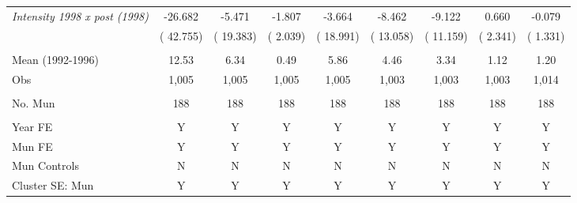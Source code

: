 \begin{tabular}{lcccccccc}
\textit{Intensity 1998 x post (1998)} &      -26.682  &       -5.471 &       -1.807 &       -3.664 &       -8.462  &       -9.122 &        0.660 &       -0.079\\  
& (      42.755)  & (      19.383) & (       2.039) & (      18.991) & (      13.058)  & (      11.159) & (       2.341) & (       1.331) \\ 
 &  & &  &  &  &  &  & \\ 
Mean (1992-1996) &        12.53  &         6.34 &         0.49 &         5.86 &         4.46  &         3.34 &         1.12  &         1.20  \\  
Obs &        1,005  &        1,005 &        1,005 &        1,005 &        1,003  &        1,003 &        1,003  &        1,014 \\ 
 &  & &  &  &  &  &  & \\ 
No. Mun &          188  &          188 &          188 &          188 &          188  &          188 &          188  &          188 \\  
&  &   &  & &  &   &  &   \\ 
Year FE & Y & Y & Y & Y & Y & Y & Y & Y  \\ 
Mun FE & Y & Y & Y & Y & Y & Y & Y & Y  \\ 
Mun Controls & N  & N & N & N & N  & N & N & N     \\  
Cluster SE: Mun & Y & Y & Y & Y & Y & Y & Y & Y  \\ 
\bottomrule
\end{tabular}
